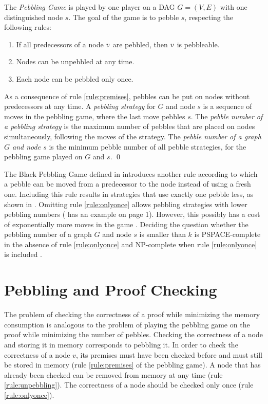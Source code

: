 \documentclass{llncs}
\begin{document}
\begin{definition}
\label{def:pebbling-game}
The \emph{Pebbling Game} is played by one player on a DAG $G = (V,E)$ with one distinguished node $s$.
The goal of the game is to pebble $s$, respecting the following rules:
\begin{enumerate}
	\item \label{rule:premises} If all predecessors of a node $v$ are pebbled, then $v$ is pebbleable.
	\item \label{rule:unpebbling} Nodes can be unpebbled at any time.
	\item \label{rule:onlyonce} Each node can be pebbled only once.
\end{enumerate}
As a consequence of rule \ref{rule:premises}, pebbles can be put on nodes without predecessors at any time.
A \emph{pebbling strategy} for $G$ and node $s$ is a sequence of moves in the pebbling game, where the last move pebbles $s$.
The \emph{pebble number of a pebbling strategy} is the maximum number of pebbles that are placed on nodes simultaneously, following the moves of the strategy.
The \emph{pebble number of a graph $G$ and node $s$} is the minimum pebble number of all pebble strategies, for the pebbling game played on $G$ and $s$.
\qed
\end{definition}

\noindent
The Black Pebbling Game defined in \cite{hertel2007black,pippenger1982advances} introduces another rule according to which a pebble can be moved from a predecessor to the node instead of using a fresh one.
Including this rule results in strategies that use exactly one pebble less, as shown in \cite{van1979move}.
Omitting rule \ref{rule:onlyonce} allows pebbling strategies with lower pebbling numbers (\cite{sethi1975complete} has an example on page 1).
However, this possibly has a cost of exponentially more moves in the game \cite{van1979move}.
Deciding the question whether the pebbling number of a graph $G$ and node $s$ is smaller than $k$ is PSPACE-complete in the absence of rule \ref{rule:onlyonce} \cite{gilbert1980pebbling} and NP-complete when rule \ref{rule:onlyonce} is included \cite{sethi1975complete}.



\section{Pebbling and Proof Checking}

The problem of checking the correctness of a proof while minimizing the memory consumption is analogous to the problem of playing the pebbling game on the proof while minimizing the number of pebbles. Checking the correctness of a node and storing it in memory corresponds to pebbling it. In order to check the correctness of a node $v$, its premises must have been checked before and must still be stored in memory (rule \ref{rule:premises} of the pebbling game). A node that has already been checked can be removed from memory at any time (rule \ref{rule:unpebbling}). The correctness of a node should be checked only once (rule \ref{rule:onlyonce}).
\end{document}
